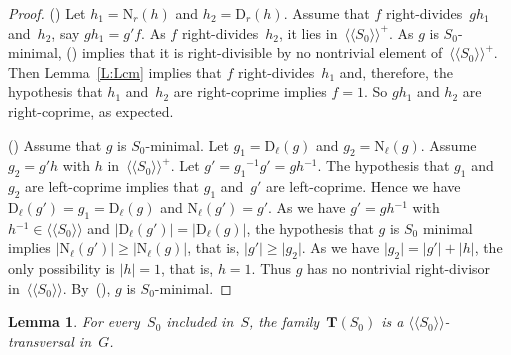 \documentclass{amsart}
\numberwithin{equation}{section}
\theoremstyle{plain}
\newtheorem{lemm}[prop]{Lemma}
\theoremstyle{definition}
\let\ge=\geqslant
\newcounter{ITEM}
\begin{document}
\begin{proof}
{\setcounter{ITEM}{3}\leavevmode\hbox{\rm()}} Let ${h}_1 = {{\scriptstyle\mathrm{N}}{_{r}}({h})}$ and ${h}_2 = {{\scriptstyle\mathrm{D}}{_{r}}({h})}$. Assume that ${f}$ right-divides~${g} {h}_1$ and~${h}_2$, say ${g} {h}_1 = {g}' {f}$. As ${f}$ right-divides~${h}_2$, it lies in~${\langle\!\langle{{{S}_0}}\rangle\!\rangle^{\!\scriptscriptstyle+}}$. As ${g}$ is ${S}_0$-minimal, {\setcounter{ITEM}{1}\leavevmode\hbox{\rm()}} implies that it is right-divisible by no nontrivial element of~${\langle\!\langle{{{S}_0}}\rangle\!\rangle^{\!\scriptscriptstyle+}}$. Then Lemma~\ref{L:Lcm} implies that ${f}$ right-divides~${h}_1$ and, therefore, the hypothesis that ${h}_1$ and~${h}_2$ are right-coprime implies ${f} = 1$. So ${g} {h}_1$ and ${h}_2$ are right-coprime, as expected.

{\setcounter{ITEM}{4}\leavevmode\hbox{\rm()}} Assume that ${g}$ is ${S}_0$-minimal. Let ${g}_1 = {{\scriptstyle\mathrm{D}}{_{\ell}}({g})}$ and ${g}_2 = {{\scriptstyle\mathrm{N}}{_{\ell}}({g})}$. Assume ${g}_2 = {g}' {h}$ with ${h}$ in~${\langle\!\langle{{{S}_0}}\rangle\!\rangle^{\!\scriptscriptstyle+}}$. Let ${g}' = {g}_1{^{-1}} {g}' = {g} {h}{^{-1}}$. The hypothesis that ${g}_1$ and~${g}_2$ are left-coprime implies that ${g}_1$ and~${g}'$ are left-coprime. Hence we have ${{\scriptstyle\mathrm{D}}{_{\ell}}({{g}'})} = {g}_1 = {{\scriptstyle\mathrm{D}}{_{\ell}}({g})}$ and ${{\scriptstyle\mathrm{N}}{_{\ell}}({{g}'})} = {g}'$. As we have ${g}' = {g} {h}{^{-1}}$ with ${h}{^{-1}} \in {\langle\!\langle{{{S}_0}}\rangle\!\rangle}$ and ${\vert{{{\scriptstyle\mathrm{D}}{_{\ell}}({{g}'})}}\vert} = {\vert{{{\scriptstyle\mathrm{D}}{_{\ell}}({g})}}\vert}$, the hypothesis that ${g}$ is ${S}_0$ minimal implies ${\vert{{{\scriptstyle\mathrm{N}}{_{\ell}}({{g}'})}}\vert} \ge {\vert{{{\scriptstyle\mathrm{N}}{_{\ell}}({g})}}\vert}$, that is, ${\vert{{g}'}\vert} \ge {\vert{{g}_2}\vert}$. As we have ${\vert{{g}_2}\vert} = {\vert{{g}'}\vert} + {\vert{h}\vert}$, the only possibility is ${\vert{h}\vert} = 1$, that is, ${h} = 1$. Thus ${g}$ has no nontrivial right-divisor in~${\langle\!\langle{{{S}_0}}\rangle\!\rangle}$. By~{\setcounter{ITEM}{1}\leavevmode\hbox{\rm()}}, ${g}$ is ${S}_0$-minimal.
\end{proof}

\begin{lemm}
For every~${S}_0$ included in~${S}$, the family~${\boldsymbol{T}}({S}_0)$ is a ${\langle\!\langle{{{S}_0}}\rangle\!\rangle}$-transversal in~${G}$.
\end{lemm}
\end{document}
